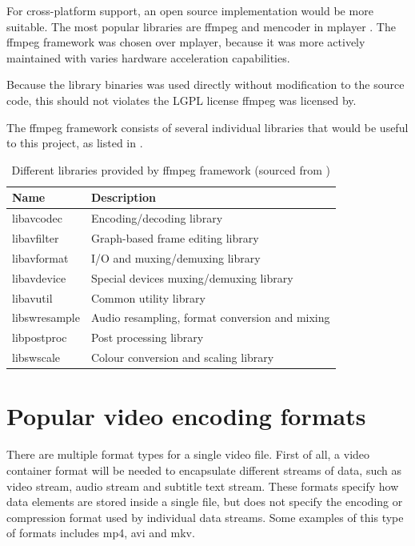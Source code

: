 For cross-platform support, an open source implementation would be more suitable. The most popular libraries are ffmpeg \cite{ffmpeg} and mencoder in mplayer \cite{mplayer}. The ffmpeg framework was chosen over mplayer, because it was more actively maintained with varies hardware acceleration capabilities.

Because the library binaries was used directly without modification to the source code, this should not violates the LGPL license ffmpeg was licensed by.

The ffmpeg framework consists of several individual libraries that would be useful to this project, as listed in .

\begin{table}[!h]
  \centering
  \begin{tabular}{l|l}
    \hline
    \textbf{Name} & \textbf{Description} \\
    \hline
    libavcodec & Encoding/decoding library  \\ \hline
    libavfilter & Graph-based frame editing library \\ \hline
    libavformat & I/O and muxing/demuxing library   \\ \hline
    libavdevice & Special devices muxing/demuxing library \\ \hline
    libavutil & Common utility library    \\ \hline
    libswresample & Audio resampling, format conversion and mixing  \\ \hline
    libpostproc & Post processing library \\ \hline
    libswscale & Colour conversion and scaling library  \\ \hline
  \end{tabular}
  \caption{\footnotesize Different libraries provided by ffmpeg framework (sourced from \cite{ffmpeg})}
  \label{tbl:ffmpeg}
\end{table}

\section{Popular video encoding formats}

There are multiple format types for a single video file. First of all, a video container format will be needed to encapsulate different streams of data, such as video stream, audio stream and subtitle text stream. These formats specify how data elements are stored inside a single file, but does not specify the encoding or compression format used by individual data streams. Some examples of this type of formats includes mp4, avi and mkv.


